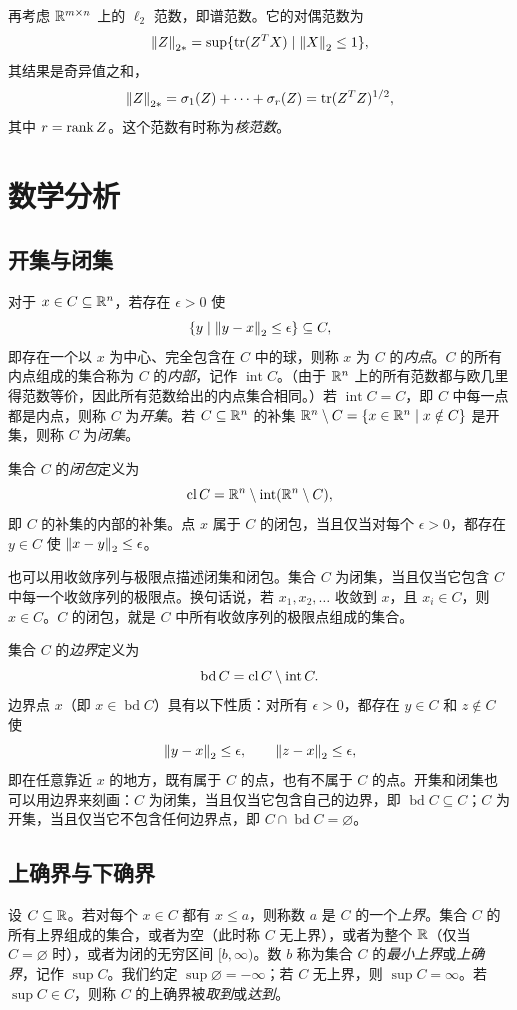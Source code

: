 再考虑 $\mathbb R^{m\times n}$ 上的 $\ell_2$ 范数，即谱范数。它的对偶范数为
\[
 \left\lVert Z\right\rVert_{2*}=\sup\{\operatorname{tr}(Z^TX)\mid\left\lVert X\right\rVert_2\leq1\},
\]
其结果是奇异值之和，
\[
 \left\lVert Z\right\rVert_{2*}=\sigma_1(Z)+\cdots+\sigma_r(Z)=\operatorname{tr}(Z^TZ)^{1/2},
\]
其中 $r=\operatorname{rank} Z$。这个范数有时称为\emph{核范数}。

\section{数学分析}
\subsection{开集与闭集}
对于 $x\in C\subseteq\mathbb R^n$，若存在 $\epsilon>0$ 使
\[
 \{y\mid\left\lVert y-x\right\rVert_2\leq\epsilon\}\subseteq C,
\]
即存在一个以 $x$ 为中心、完全包含在 $C$ 中的球，则称 $x$ 为 $C$ 的\emph{内点}。$C$ 的所有内点组成的集合称为 $C$ 的\emph{内部}，记作 $\operatorname{int}C$。（由于 $\mathbb R^n$ 上的所有范数都与欧几里得范数等价，因此所有范数给出的内点集合相同。）若 $\operatorname{int}C=C$，即 $C$ 中每一点都是内点，则称 $C$ 为\emph{开集}。若 $C\subseteq\mathbb R^n$ 的补集 $\mathbb R^n\setminus C=\{x\in\mathbb R^n\mid x\notin C\}$ 是开集，则称 $C$ 为\emph{闭集}。

集合 $C$ 的\emph{闭包}定义为
\[
 \operatorname{cl} C=\mathbb R^n\setminus\operatorname{int}(\mathbb R^n\setminus C),
\]
即 $C$ 的补集的内部的补集。点 $x$ 属于 $C$ 的闭包，当且仅当对每个 $\epsilon>0$，都存在 $y\in C$ 使 $\left\lVert x-y\right\rVert_2\leq\epsilon$。

也可以用收敛序列与极限点描述闭集和闭包。集合 $C$ 为闭集，当且仅当它包含 $C$ 中每一个收敛序列的极限点。换句话说，若 $x_1,x_2,\ldots$ 收敛到 $x$，且 $x_i\in C$，则 $x\in C$。$C$ 的闭包，就是 $C$ 中所有收敛序列的极限点组成的集合。

集合 $C$ 的\emph{边界}定义为
\[
 \operatorname{bd}C=\operatorname{cl} C\setminus\operatorname{int}C.
\]
边界点 $x$（即 $x\in\operatorname{bd}C$）具有以下性质：对所有 $\epsilon>0$，都存在 $y\in C$ 和 $z\notin C$ 使
\[
 \left\lVert y-x\right\rVert_2\leq\epsilon,\qquad\left\lVert z-x\right\rVert_2\leq\epsilon,
\]
即在任意靠近 $x$ 的地方，既有属于 $C$ 的点，也有不属于 $C$ 的点。开集和闭集也可以用边界来刻画：$C$ 为闭集，当且仅当它包含自己的边界，即 $\operatorname{bd}C\subseteq C$；$C$ 为开集，当且仅当它不包含任何边界点，即 $C\cap\operatorname{bd}C=\varnothing$。

\subsection{上确界与下确界}
设 $C\subseteq\mathbb R$。若对每个 $x\in C$ 都有 $x\leq a$，则称数 $a$ 是 $C$ 的一个\emph{上界}。集合 $C$ 的所有上界组成的集合，或者为空（此时称 $C$ 无上界），或者为整个 $\mathbb R$（仅当 $C=\varnothing$ 时），或者为闭的无穷区间 $[b,\infty)$。数 $b$ 称为集合 $C$ 的\emph{最小上界}或\emph{上确界}，记作 $\sup C$。我们约定 $\sup\varnothing=-\infty$；若 $C$ 无上界，则 $\sup C=\infty$。若 $\sup C\in C$，则称 $C$ 的上确界被\emph{取到}或\emph{达到}。

